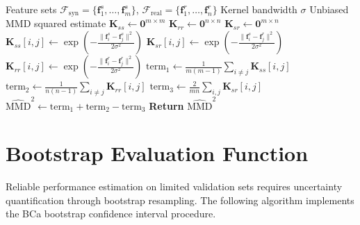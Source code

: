 \begin{algorithm}[H]
\caption{MMD Squared Computation}
\label{alg:mmd_computation}
\begin{algorithmic}[1]
\Require Feature sets $\mathcal{F}_{\text{syn}} = \{\mathbf{f}_1^s, \ldots, \mathbf{f}_m^s\}$, $\mathcal{F}_{\text{real}} = \{\mathbf{f}_1^r, \ldots, \mathbf{f}_n^r\}$
\Require Kernel bandwidth $\sigma$
\Ensure Unbiased MMD squared estimate
\State {}
\State $\mathbf{K}_{ss} \gets \mathbf{0}^{m \times m}$
\State $\mathbf{K}_{rr} \gets \mathbf{0}^{n \times n}$
\State $\mathbf{K}_{sr} \gets \mathbf{0}^{m \times n}$
        \State $\mathbf{K}_{ss}[i,j] \gets \exp\left(-\frac{\|\mathbf{f}_i^s - \mathbf{f}_j^s\|^2}{2\sigma^2}\right)$
    \EndFor
        \State $\mathbf{K}_{sr}[i,j] \gets \exp\left(-\frac{\|\mathbf{f}_i^s - \mathbf{f}_j^r\|^2}{2\sigma^2}\right)$
    \EndFor
\EndFor
{}
        \State $\mathbf{K}_{rr}[i,j] \gets \exp\left(-\frac{\|\mathbf{f}_i^r - \mathbf{f}_j^r\|^2}{2\sigma^2}\right)$
    \EndFor
\EndFor
\State {}
\State $\text{term}_1 \gets \frac{1}{m(m-1)} \sum_{i \neq j} \mathbf{K}_{ss}[i,j]$
\State $\text{term}_2 \gets \frac{1}{n(n-1)} \sum_{i \neq j} \mathbf{K}_{rr}[i,j]$
\State $\text{term}_3 \gets \frac{2}{mn} \sum_{i,j} \mathbf{K}_{sr}[i,j]$
\State $\widehat{\text{MMD}}^2 \gets \text{term}_1 + \text{term}_2 - \text{term}_3$
\State \textbf{Return} $\widehat{\text{MMD}}^2$
\end{algorithmic}
\end{algorithm}

\section{Bootstrap Evaluation Function}
\label{sec:bootstrap_eval}

Reliable performance estimation on limited validation sets requires uncertainty quantification through bootstrap resampling. The following algorithm implements the BCa bootstrap confidence interval procedure.


